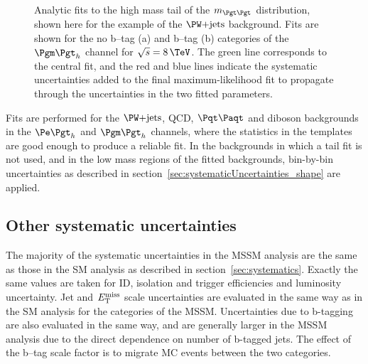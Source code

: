 \begin{figure}[tbh]
\caption[Analytic fits to the high mass tail of the $m_{\Pgt\Pgt}$ distribution,
shown for the example of the $\WJets$ background.]{Analytic fits to the high mass tail of the $m_{\Pgt\Pgt}$ distribution,
shown here for the example of the $\WJets$ background. Fits are shown for the
no b--tag (a) and b--tag (b) categories of the $\mutau$ channel for
$\sqrt{s}=8\,\TeV$. The green line corresponds to the central fit, and the red and blue
lines indicate the systematic uncertainties added to the final
maximum-likelihood fit to propagate through the
uncertainties in the two fitted parameters.}
\label{fig:tailfits}
\end{figure}

Fits are performed for the $\WJets$, QCD, $\ttbar$ and diboson backgrounds in the $\etau$
and $\mutau$ channels, where the statistics in the templates are good enough to
produce a reliable fit. In the backgrounds in which a tail fit is not used, and
in the low mass regions of the fitted backgrounds, bin-by-bin uncertainties as
described in section~\ref{sec:systematicUncertainties_shape} are applied.

\subsection{Other systematic uncertainties}
The majority of the systematic uncertainties in the \ac{MSSM} analysis are the
same as those in the \ac{SM} analysis as described in
section~\ref{sec:systematics}. Exactly the same values are taken for ID, isolation and
trigger efficiencies and luminosity uncertainty. Jet and $E_{\mathrm{T}}^{\text{miss}}$ scale
uncertainties are evaluated in the same way as in the \ac{SM} analysis 
for the categories of the \ac{MSSM}. 
Uncertainties due to b-tagging are also evaluated in the same way, 
and are generally larger in the \ac{MSSM} analysis due to
the direct dependence on number of b-tagged jets. The effect of the b--tag scale
factor is to migrate \ac{MC} events between the two categories.

